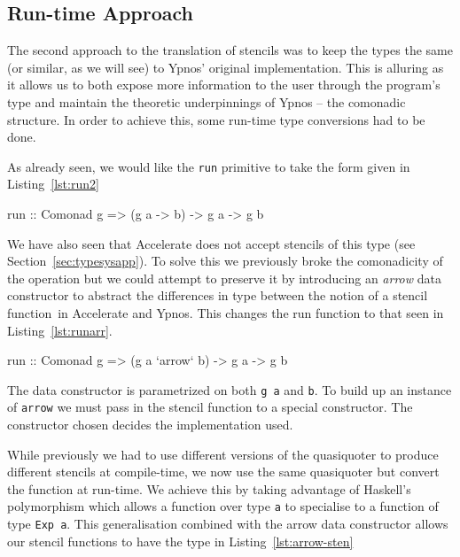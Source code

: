 \documentclass[12pt,a4paper,twoside]{scrbook}
\begin{document}
\subsection{Run-time Approach}
\label{sec:runtimetrans}

The second approach to the translation of stencils was to keep the types the
same (or similar, as we will see) to Ypnos' original implementation.  This is
alluring as it allows us to both expose more information to the user through the
program's type and maintain the theoretic underpinnings of Ypnos -- the
comonadic structure. In order to achieve this, some run-time type conversions
had to be done.

As already seen, we would like the \texttt{run} primitive to take the
form given in Listing~\ref{lst:run2}

\begin{hflisting}[label={lst:run2}, caption=The comonadic run type. Changing the
  type of \texttt{g} could change the backend used.]
run :: Comonad g => (g a -> b) -> g a -> g b
\end{hflisting}

We have also seen that Accelerate does not accept stencils of this type (see
Section~\ref{sec:typesysapp}).  To solve this we previously broke the
comonadicity of the operation but we could attempt to preserve it by introducing
an \emph{arrow} data constructor to abstract the differences in type between the
notion of a stencil function\ in Accelerate and Ypnos. This changes the run
function to that seen in Listing~\ref{lst:runarr}.

\begin{hflisting}[label={lst:runarr}, caption=The type run is generalised to
  using the \texttt{arrow} type.]
run :: Comonad g => (g a `arrow` b) -> g a -> g b
\end{hflisting}

The data constructor is parametrized on both \texttt{g a} and
\texttt{b}. To build up an instance of \texttt{arrow} we must pass in the
stencil function to a special constructor. The constructor chosen
decides the implementation used.

While previously we had to use different versions of the quasiquoter to produce
different stencils at compile-time, we now use the same quasiquoter but convert
the function at run-time. We achieve this by taking advantage of Haskell's
polymorphism which allows a function over type \texttt{a} to specialise to a
function of type \texttt{Exp a}. This generalisation combined with the arrow
data constructor allows our stencil functions to have the type in
Listing~\ref{lst:arrow-sten}
\end{document}
